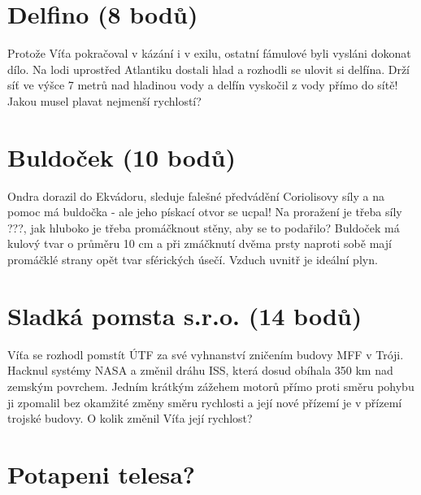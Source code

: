 \documentclass[10pt,a4paper,landscape]{article}
\begin{document}
\begin{multicols}{2}[]
\section{Delfino (8 bodů)}
Protože Víťa pokračoval v kázání i v exilu, ostatní fámulové byli vysláni dokonat dílo. Na lodi uprostřed Atlantiku dostali hlad a rozhodli se ulovit si delfína. Drží síť ve výšce 7 metrů nad hladinou vody a delfín vyskočil z vody přímo do sítě! Jakou musel plavat nejmenší rychlostí?

\section{Buldoček (10 bodů)}
Ondra dorazil do Ekvádoru, sleduje falešné předvádění Coriolisovy síly a na pomoc má buldočka - ale jeho pískací otvor se ucpal! Na proražení je třeba síly ???, jak hluboko je třeba promáčknout stěny, aby se to podařilo? Buldoček má kulový tvar o průměru 10 cm a při zmáčknutí dvěma prsty naproti sobě mají promáčklé strany opět tvar sférických úsečí. Vzduch uvnitř je ideální plyn.

\section{Sladká pomsta s.r.o. (14 bodů)}
Víťa se rozhodl pomstít ÚTF za své vyhnanství zničením budovy MFF v Tróji. Hacknul systémy NASA a změnil dráhu ISS, která dosud obíhala 350 km nad zemským povrchem. Jedním krátkým zážehem motorů přímo proti směru pohybu ji zpomalil bez okamžité změny směru rychlosti a její nové přízemí je v přízemí trojské budovy. O kolik změnil Víťa její rychlost?

\section{Potapeni telesa?}
\section{}

\end{multicols}
\end{document}
